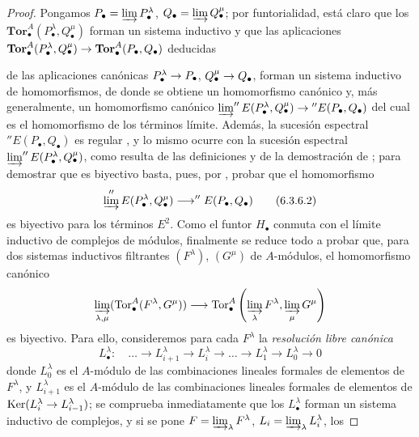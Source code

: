 \documentclass[10pt,oneside,openany]{book}
\theoremstyle{egaenv}\newtheorem*{env}{---}
\theoremstyle{egastatement}
\theoremstyle{egadescription}
\newcommand{\oldpage}[2][]{\marginnote{\normalfont\scriptsize\textbf{#1}\,|\,#2}\ignorespaces}
\renewcommand{\to}{\mathchoice{\longrightarrow}{\rightarrow}{\rightarrow}{\rightarrow}}
\begin{document}
\begin{proof}
Pongamos $P_\bullet=\varinjlim P_\bullet^\lambda$,
$Q_\bullet=\varinjlim Q_\bullet^\mu$; por funtorialidad, está claro que
los $\mathbf{Tor}_\bullet^A(P_\bullet^\lambda,Q_\bullet^\mu)$ forman un
sistema inductivo y que las aplicaciones
$\mathbf{Tor}_\bullet^A(P_\bullet^\lambda,Q_\bullet^\mu)\to
\mathbf{Tor}_\bullet^A(P_\bullet,Q_\bullet)$ deducidas

\oldpage[III]{143}

de las aplicaciones canónicas $P_\bullet^\lambda\to P_\bullet$,
$Q_\bullet^\mu\to Q_\bullet$, forman un sistema inductivo de homomorfismos,
de donde se obtiene un homomorfismo canónico  y, más
generalmente,
un homomorfismo canónico
$\varinjlim''E(P_\bullet^\lambda,Q_\bullet^\mu)\to''E(P_\bullet,Q_\bullet)$
del cual  es el homomorfismo de los términos límite.
Además, la sucesión espectral $''E(P_\bullet,Q_\bullet)$ es regular
, y lo mismo
ocurre con la sucesión espectral
$\varinjlim''E(P_\bullet^\lambda,Q_\bullet^\mu)$, como resulta
de las definiciones  y de la demostración de
; para demostrar que  es biyectivo basta,
pues, por , probar que el
homomorfismo
\[
  \varinjlim''E(P_\bullet^\lambda,Q_\bullet^\mu)
  \longrightarrow ''E(P_\bullet,Q_\bullet)
  \tag{6.3.6.2}\label{III.6.3.6.2.fr}
\]
es biyectivo para los términos $E^2$. Como el funtor $H_\bullet$ conmuta con
el límite inductivo de complejos de módulos, finalmente se reduce todo a
probar que, para dos sistemas inductivos filtrantes $(F^\lambda)$,
$(G^\mu)$ de $A$-módulos, el homomorfismo canónico
\[
  \varinjlim_{\lambda,\mu}(\operatorname{Tor}_\bullet^A(F^\lambda,G^\mu))
  \longrightarrow
  \operatorname{Tor}_\bullet^A
  \left(\varinjlim_\lambda F^\lambda,
        \varinjlim_\mu G^\mu\right)
\]
es biyectivo. Para ello, consideremos para cada $F^\lambda$ la \emph{resolución
libre canónica}
\[
  L_\bullet^\lambda:\quad
  \ldots\longrightarrow L_{i+1}^\lambda
  \longrightarrow L_i^\lambda\longrightarrow\ldots
  \longrightarrow L_1^\lambda\longrightarrow L_0^\lambda\longrightarrow0
\]
donde $L_0^\lambda$ es el $A$-módulo de las combinaciones lineales formales
de elementos de $F^\lambda$, y $L_{i+1}^\lambda$ es el $A$-módulo de las
combinaciones lineales formales de elementos de
$\operatorname{Ker}(L_i^\lambda\to L_{i-1}^\lambda)$; se comprueba
inmediatamente que los $L_\bullet^\lambda$ forman un sistema inductivo de
complejos, y si se pone
$F=\varinjlim_\lambda F^\lambda$, $L_i=\varinjlim_\lambda L_i^\lambda$, los

\end{proof}
\end{document}
